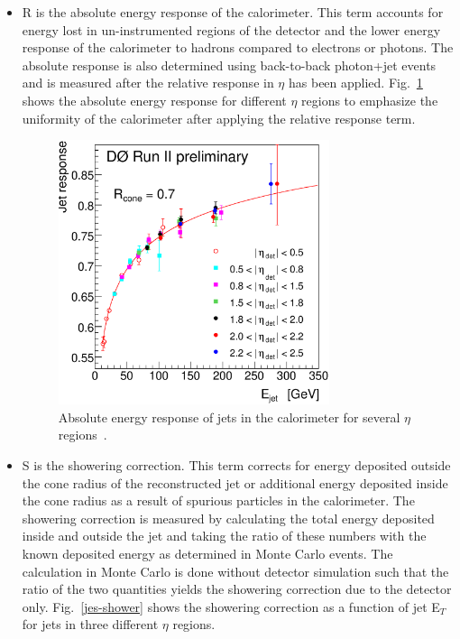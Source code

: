 \begin{itemize}
\item R is the absolute energy response of the calorimeter. This term accounts for energy lost in un-instrumented regions of the detector and the lower energy response of the calorimeter to hadrons compared to electrons or photons. The absolute response is also determined using back-to-back photon+jet events and is measured after the relative response in $\eta$ has been applied. Fig.~\ref{jes-absolute} shows the absolute energy response for different $\eta$ regions to emphasize the uniformity of the calorimeter after applying the relative response term.

\begin{figure}[!h!tbp]
\begin{center}
\includegraphics[width=0.75\textwidth]{eps/Reco/JES-absolute.eps}
\end{center}
\vspace{-0.1in}
\caption{Absolute energy response of jets in the calorimeter for several $\eta$ regions~\cite{jes}.}
\label{jes-absolute}
\end{figure}

\item S is the showering correction. This term corrects for energy deposited outside the cone radius of the reconstructed jet or additional energy deposited inside the cone radius as a result of spurious particles in the calorimeter. The showering correction is measured by calculating the total energy deposited inside and outside the jet and taking the ratio of these numbers with the known deposited energy as determined in Monte Carlo events. The calculation in Monte Carlo is done without detector simulation such that the ratio of the two quantities yields the showering correction due to the detector only. Fig.~\ref{jes-shower} shows the showering correction as a function of jet E$_{T}$ for jets in three different $\eta$ regions.


\end{itemize}
